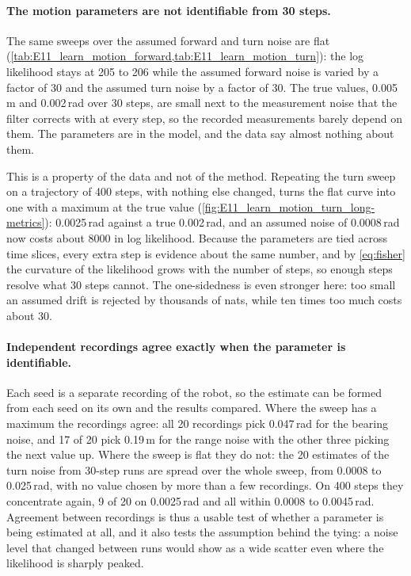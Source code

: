 \paragraph{The motion parameters are not identifiable from 30 steps.} The same sweeps over the assumed forward
and turn noise are flat (\cref{tab:E11_learn_motion_forward,tab:E11_learn_motion_turn}): the log likelihood stays
at 205 to 206 while the assumed forward noise is varied by a factor of 30 and the assumed turn noise by a factor
of 30. The true values, 0.005\,m and 0.002\,rad over 30 steps, are small next to the measurement noise that the
filter corrects with at every step, so the recorded measurements barely depend on them. The parameters are in the
model, and the data say almost nothing about them.

This is a property of the data and not of the method. Repeating the turn sweep on a trajectory of 400 steps, with
nothing else changed, turns the flat curve into one with a maximum at the true value
(\cref{fig:E11_learn_motion_turn_long-metrics}): 0.0025\,rad against a true 0.002\,rad, and an assumed noise of
0.0008\,rad now costs about 8000 in log likelihood. Because the parameters are tied across time slices, every
extra step is evidence about the same number, and by \eqref{eq:fisher} the curvature of the likelihood grows with
the number of steps, so enough steps resolve what 30 steps cannot.
The one-sidedness is even stronger here: too small an assumed drift is rejected by thousands of nats, while ten
times too much costs about 30.

\paragraph{Independent recordings agree exactly when the parameter is identifiable.} Each seed is a separate
recording of the robot, so the estimate can be formed from each seed on its own and the results compared. Where
the sweep has a maximum the recordings agree: all 20 recordings pick 0.047\,rad for the bearing noise, and 17 of
20 pick 0.19\,m for the range noise with the other three picking the next value up. Where the sweep is flat they
do not: the 20 estimates of the turn noise from 30-step runs are spread over the whole sweep, from 0.0008 to
0.025\,rad, with no value chosen by more than a few recordings. On 400 steps they concentrate again, 9 of 20 on
0.0025\,rad and all within 0.0008 to 0.0045\,rad. Agreement between recordings is thus a usable test of whether a
parameter is being estimated at all, and it also tests the assumption behind the tying: a noise level that changed
between runs would show as a wide scatter even where the likelihood is sharply peaked.

